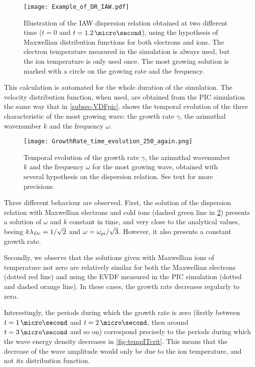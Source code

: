   \begin{figure}[hbtp]
    \centering
    \texttt{[image: Example\_of\_DR\_IAW.pdf]}
    \caption{Illustration of the \ac{IAW} dispersion relation obtained at two different time ($t=0$ and $t=1.2\,\micro\second$), using the hypothesis of Maxwellian distribution functions for both electrons and ions. The electron temperature measured in the simulation is always used, but the ion temperature is only used once. The most growing solution is marked with a circle on the growing rate and the frequency.}
    \label{fig-Example_of_DR_IAW}
  \end{figure}
  
  
  This calculation is automated for the whole duration of the simulation.
  The velocity distribution function, when used, are obtained from the \ac{PIC} simulation the same way that in \cref{subsec-VDFpic}.
   shows the temporal evolution of the three characteristic of the most growing wave: the growth rate $\gamma$, the azimuthal wavenumber $k$ and the frequency $\omega$.
  \begin{figure}[hbtp]
    \centering
    \texttt{[image: GrowthRate\_time\_evolution\_250\_again.png]}  %
    \caption{Temporal evolution of the growth rate $\gamma$, the azimuthal wavenumber $k$ and the frequency $\omega$ for the most growing wave, obtained with several hypothesis on the dispersion relation. See text for more precisions. }
    \label{fig-time_wave}
  \end{figure}
  
  Three different behaviour are observed.
  First, the solution of the dispersion relation with Maxwellian electrons and cold ions (dashed green line in \cref{fig-time_wave}) presents a solution of $\omega$ and $k$ constant in time, and very close to the analytical values, beeing $k \lambda_{De} = 1/\sqrt{2}$ and $\omega = \omega_{pi}/\sqrt{3}$.
  However, it also presents a constant growth rate.
  
  Secondly, we observe that the solutions given with Maxwellian ions of temperature not zero are relatively similar for both the Maxwellian electrons  (dotted red line) and using the \ac{EVDF} measured in the \ac{PIC} simulation (dotted and dashed orange line).
  In these cases, the growth rate decreases regularly to zero.
  
  Interestingly, the periods during which the growth rate is zero (firstly between $t=1\,\micro\second$ and $t=2\,\micro\second$, then around $t=3\,\micro\second$ and so on) correspond precisely to the periods during which the wave energy density decreases in \vref{fig-tempITcrit}.
  This means that the decrease of the wave amplitude would only be due to the ion temperature, and not its distribution function.
  
